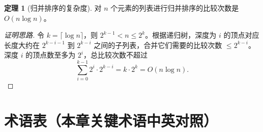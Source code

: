 \documentclass[UTF8,11pt,a4paper]{ctexbook}   %
\theoremstyle{definition}
\newtheorem{theorem}{定理}[section]
\begin{document}
\begin{theorem}[归并排序的复杂度]
对 $n$ 个元素的列表进行归并排序的比较次数是 $O(n \log n)$。
\end{theorem}

\begin{proof}[证明思路]
令 $k = \lceil \log n \rceil$，则 $2^{k-1} < n \leq 2^k$。根据递归树，深度为 $i$ 的顶点对应长度大约在 $2^{k-i-1}$ 到 $2^{k-i}$ 之间的子列表，合并它们需要的比较次数 $\leq 2^{k-i}$。深度 $i$ 的顶点数至多为 $2^i$，总比较次数不超过
\[
\sum_{i=0}^{k-1} 2^i \cdot 2^{k-i} = k \cdot 2^k = O(n \log n).
\]
\end{proof}

\newpage
\section*{术语表（本章关键术语中英对照）}
\end{document}
